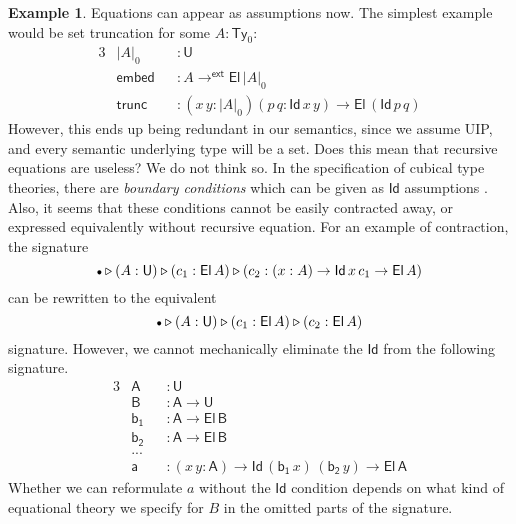 \documentclass[12pt,a4paper,twoside,openany]{book}
\theoremstyle{remark}
\theoremstyle{definition}
\newtheorem{myexample}{Example}
\theoremstyle{theorem}
\newcommand{\ms}[1]{\mathsf{#1}}
\newcommand{\Ty}{\mathsf{Ty}}
\newcommand{\U}{\mathsf{U}}
\newcommand{\El}{\mathsf{El}}
\newcommand{\Id}{\mathsf{Id}}
\newcommand{\ext}{\triangleright}
\newcommand{\emptycon}{\scaleobj{.75}\bullet}
\newcommand{\toe}{\to^{\ms{ext}}}
\begin{document}
\begin{myexample} Equations can appear as assumptions now. The simplest
example would be set truncation for some $A : \Ty_0$:
\begin{alignat*}{3}
  &|A|_0      &&: \U\\
  &\ms{embed} &&: A \toe \El\,|A|_0 \\
  &\ms{trunc} &&: (x\,y : |A|_0)(p\,q : \Id\,x\,y) \to \El\,(\Id\,p\,q)
\end{alignat*}
However, this ends up being redundant in our semantics, since we assume UIP,
and every semantic underlying type will be a set. Does this mean that recursive
equations are useless? We do not think so. In the specification of cubical type
theories, there are \emph{boundary conditions} which can be given as $\Id$
assumptions \cite{cchm,angiuli2016computational,angiuli2018cartesian}. Also, it
seems that these conditions cannot be easily contracted away, or expressed
equivalently without recursive equation. For an example of contraction, the
signature
\[\emptycon \ext (A : \U) \ext (c_1 : \El\,A) \ext (c_2 : (x : A) \to \Id\,x\,c_1 \to \El\,A)\]
can be rewritten to the equivalent
\[\emptycon \ext (A : \U) \ext (c_1 : \El\,A) \ext (c_2 : \El\,A)\]
signature. However, we cannot mechanically eliminate the $\Id$ from the following signature.
\begin{alignat*}{3}
  &\ms{A  } &&: \U\\
  &\ms{B  } &&: \ms{A} \to \U\\
  &\ms{b_1} &&: \ms{A} \to \El\,\ms{B}\\
  &\ms{b_2} &&: \ms{A} \to \El\,\ms{B}\\
  &...&&\\
  &\ms{a}   &&: (x\,y : \ms{A}) \to \Id\,(\ms{b_1}\,x)\,(\ms{b_2}\,y) \to \El\,\ms{A}
\end{alignat*}
Whether we can reformulate $a$ without the $\Id$ condition depends on what kind
of equational theory we specify for $B$ in the omitted parts of the signature.
\end{myexample}
\end{document}
